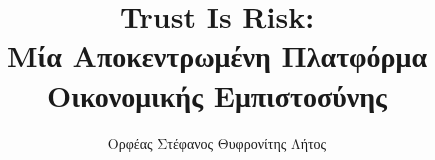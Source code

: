 \title{\textlatin{Trust Is Risk}: \\ Μία Αποκεντρωμένη Πλατφόρμα Οικονομικής Εμπιστοσύνης}
\author{Ορφέας Στέφανος Θυφρονίτης Λήτος}        
\maketitle
